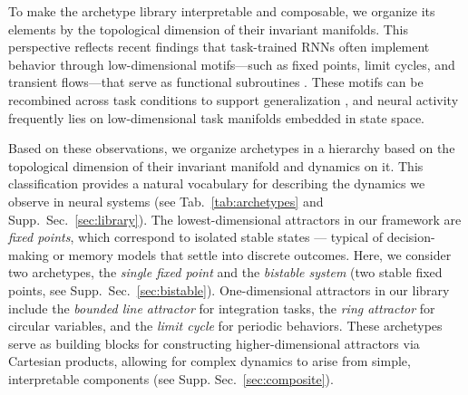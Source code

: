 \documentclass{article}
\newcommand{\mpcomment}[1]{\textcolor{mpcolor}{(#1)}}
\theoremstyle{definition} \newtheorem{definition}{Definition}  \newtheorem{example}{Example}
\theoremstyle{remark} \newtheorem{remark}{Remark}
\newcounter{ct}
\begin{document}
To make the archetype library interpretable and composable, we organize its elements by the topological dimension of their invariant manifolds. This perspective reflects recent findings that task-trained RNNs often implement behavior through low-dimensional motifs---such as fixed points, limit cycles, and transient flows---that serve as functional subroutines \citep{driscoll2024flexible}. These motifs can be recombined across task conditions to support generalization \citep{tafazoli2024building}, and neural activity frequently lies on low-dimensional task manifolds embedded in state space\citep{langdon2023unifying,can2021emergence,cueva2021continuous,gort2024emergence,mishra2021continual,chaudhuri2019attractor,ghazizadeh2021slowmanifold,duncker2021dynamics, pezon2024linking,fortunato2024nonlinear}.

Based on these observations, we organize archetypes in a hierarchy based on the topological dimension of their invariant manifold and dynamics on it.
This classification provides a natural vocabulary for describing the dynamics we observe in neural systems (see Tab.~\ref{tab:archetypes} and Supp.~Sec.~\ref{sec:library}). 
The lowest-dimensional attractors in our framework are \emph{fixed points}, which correspond to isolated stable states --- typical of decision-making or memory models that settle into discrete outcomes. 
Here, we consider two archetypes, the \emph{single fixed point} and the \emph{bistable system} (two stable fixed points, see Supp.~Sec.~\ref{sec:bistable}).
One-dimensional attractors in our library include the \emph{bounded line attractor} for integration tasks, the \emph{ring attractor} for circular variables, and the \emph{limit cycle} for periodic behaviors.
These archetypes serve as building blocks for constructing higher-dimensional attractors via Cartesian products, allowing for complex dynamics to arise from simple, interpretable components (see Supp. Sec.~\ref{sec:composite}).
\end{document}
